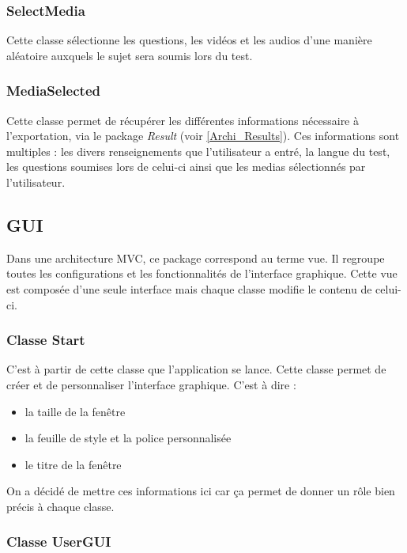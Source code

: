 \subsubsection{SelectMedia}

Cette classe sélectionne les questions, les vidéos et les audios d'une manière aléatoire auxquels le sujet sera soumis lors du test.

\subsubsection{MediaSelected}

Cette classe permet de récupérer les différentes informations nécessaire à l'exportation, via le package \textit{Result} (voir \ref{Archi_Results}). Ces informations sont multiples : les divers renseignements que l'utilisateur a entré, la langue du test, les questions soumises lors de celui-ci ainsi que les medias sélectionnés par l'utilisateur.


\subsection{GUI}

Dans une architecture MVC, ce package correspond au terme vue. Il regroupe toutes les configurations et les fonctionnalités de l'interface graphique. Cette vue est composée d'une seule interface mais chaque classe modifie le contenu de celui-ci.

\subsubsection{Classe Start}

C'est à partir de cette classe que l'application se lance.
Cette classe permet de créer et de personnaliser l'interface graphique. C'est à dire :
\begin{itemize}
 \item la taille de la fenêtre
 \item la feuille de style et la police personnalisée
 \item le titre de la fenêtre
\end{itemize}
On a décidé de mettre ces informations ici car ça permet de donner un rôle bien précis à chaque classe.

\subsubsection{Classe UserGUI}

